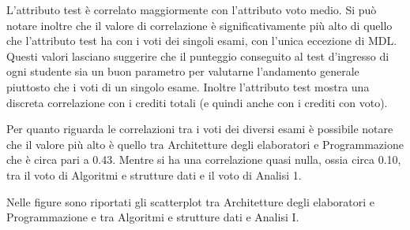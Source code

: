 \documentclass[12pt]{article}
\begin{document}
L'attributo test è correlato maggiormente con l'attributo voto medio. 
Si può notare inoltre che il valore di correlazione è significativamente più alto di quello che l'attributo test ha con i voti dei singoli esami, con l'unica eccezione di MDL.
Questi valori lasciano suggerire che il punteggio conse\-guito al test d'ingresso di ogni studente sia un buon parametro per valutar\-ne l'andamento generale piuttosto che i voti di un singolo esame.
Inoltre l'attributo test mostra una discreta correlazione con i crediti totali (e quindi anche con i crediti con voto).

Per quanto riguarda le correlazioni tra i voti dei diversi esami è possibi\-le notare che il valore più alto è quello tra Architetture degli elaboratori e Programmazione che è circa pari a 0.43.
Mentre si ha una correlazione quasi nulla, ossia circa 0.10, tra il voto di Algoritmi e strutture dati e il voto di Analisi 1.

Nelle figure sono riportati gli scatterplot tra Architetture degli elabora\-tori e Programmazione e tra Algoritmi e strutture dati  e Analisi I.
\end{document}

